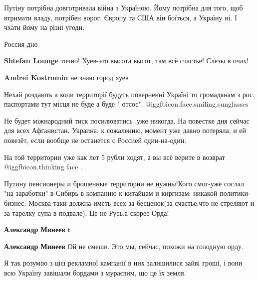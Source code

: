 \begin{itemize}

Путіну потрібна довготривала війна з Україною. Йому потрібна для того, щоб
втримати владу, потрібен ворог. Європу та США він боїться, а Україну ні. І
чхати йому на різні угоди.


Россия дно

\begin{itemize} %
\textbf{Shtefan Lounge} точно! Хуев-это высота высот, там всё счастье! Слезы в очах!

\textbf{Andrei Kostromin} не знаю город хуев
\end{itemize} %

Нехай роздають а коли территорії будуть поверненні Україні то громадянам з рос. паспортами тут місця не буде а буде " отсос". @igg{fbicon.face.smiling.sunglasses} 


Не будет міжнародний тиск посилюватись ,уже никогда. На повестке дня сейчас для
всех Афганистан. Украина, к сожалению, момент уже давно потеряла, и ей повезёт,
если вообще не останется с Россией один-на-один.



На той территории уже как лет 5 рубли ходят, а вы всё верите в возврат @igg{fbicon.thinking.face} .


Путину пенсионеры и брошенные территории не нужны!Кого смог-уже сослал "на
заработки" в Сибирь в компанию к китайцам и киргизам: никакой политики-бизнес:
Москва таки должна иметь всех за бесценок(за счастье,что не стреляют и за
тарелку супа в подвале). Це не Русь,а скорее Орда!

\begin{itemize} %
\textbf{Александр Минеев} t

\textbf{Александр Минеев} Ой не смеши. Это мы, сейчас, похожи на голодную орду.
\end{itemize} %


Я так розумію з цієї рекламної кампанії в них залишилися зайві гроші, і вони
всю Україну завішали бордами з мураєвим, що це їх земля.




\end{itemize}
